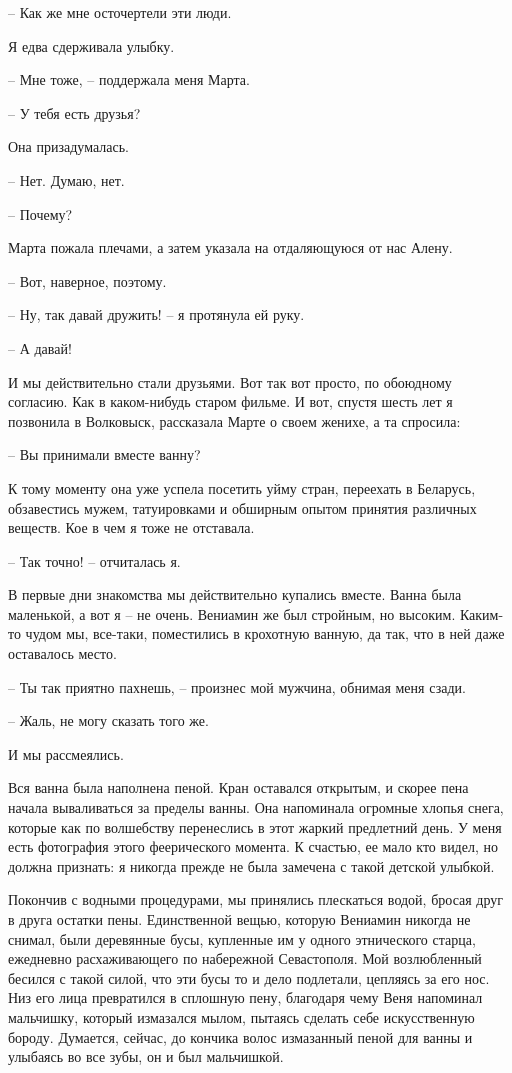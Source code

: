 \documentclass[
]{book}
\begin{document}
-- Как же мне осточертели эти люди.

Я едва сдерживала улыбку.

-- Мне тоже, -- поддержала меня Марта.

-- У тебя есть друзья?

Она призадумалась.

-- Нет. Думаю, нет.

-- Почему?

Марта пожала плечами, а затем указала на отдаляющуюся от нас Алену.

-- Вот, наверное, поэтому.

-- Ну, так давай дружить! -- я протянула ей руку.

-- А давай!

И мы действительно стали друзьями. Вот так вот просто, по обоюдному согласию. Как в каком-нибудь старом фильме. И вот, спустя шесть лет я позвонила в Волковыск, рассказала Марте о своем женихе, а та спросила:

-- Вы принимали вместе ванну?

К тому моменту она уже успела посетить уйму стран, переехать в Беларусь, обзавестись мужем, татуировками и обширным опытом принятия различных веществ. Кое в чем я тоже не отставала.

-- Так точно! -- отчиталась я.

В первые дни знакомства мы действительно купались вместе. Ванна была маленькой, а вот я -- не очень. Вениамин же был стройным, но высоким. Каким-то чудом мы, все-таки, поместились в крохотную ванную, да так, что в ней даже оставалось место.

-- Ты так приятно пахнешь, -- произнес мой мужчина, обнимая меня сзади.

-- Жаль, не могу сказать того же.

И мы рассмеялись.

Вся ванна была наполнена пеной. Кран оставался открытым, и скорее пена начала вываливаться за пределы ванны. Она напоминала огромные хлопья снега, которые как по волшебству перенеслись в этот жаркий предлетний день. У меня есть фотография этого феерического момента. К счастью, ее мало кто видел, но должна признать: я никогда прежде не была замечена с такой детской улыбкой.

Покончив с водными процедурами, мы принялись плескаться водой, бросая друг в друга остатки пены. Единственной вещью, которую Вениамин никогда не снимал, были деревянные бусы, купленные им у одного этнического старца, ежедневно расхаживающего по набережной Севастополя. Мой возлюбленный бесился с такой силой, что эти бусы то и дело подлетали, цепляясь за его нос. Низ его лица превратился в сплошную пену, благодаря чему Веня напоминал мальчишку, который измазался мылом, пытаясь сделать себе искусственную бороду. Думается, сейчас, до кончика волос измазанный пеной для ванны и улыбаясь во все зубы, он и был мальчишкой.
\end{document}

